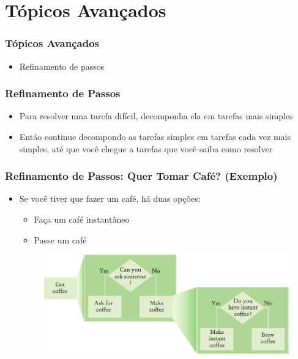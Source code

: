 \documentclass[xcolor={dvipsnames,table},aspectratio=169]{beamer}
\begin{document}
\section{Tópicos Avançados}

\begin{frame}\frametitle{Tópicos Avançados}
\begin{itemize}
	\item Refinamento de passos
\end{itemize}
\end{frame}

\begin{frame}\frametitle{Refinamento de Passos}
\begin{itemize}
	\item Para resolver uma tarefa difícil, decomponha ela em tarefas mais simples
	\item Então continue decompondo as tarefas simples em tarefas cada vez mais simples, até que você chegue a tarefas que você saiba como resolver
\end{itemize}
\end{frame}

\begin{frame}\frametitle{Refinamento de Passos: Quer Tomar Café? (Exemplo)}
\begin{itemize}
	\item Se você tiver que fazer um café, há duas opçôes:
	\begin{itemize}
		\item Faça um café instantâneo
		\item Passe um café
	\end{itemize}
\begin{figure}[h]
	\includegraphics[height=0.50\paperheight,center]{pucrs-ep-fprog-unidade_05-metodos-laminas-get_coffe_1.png}
\end{figure}
\end{itemize}
\end{frame}
\end{document}
